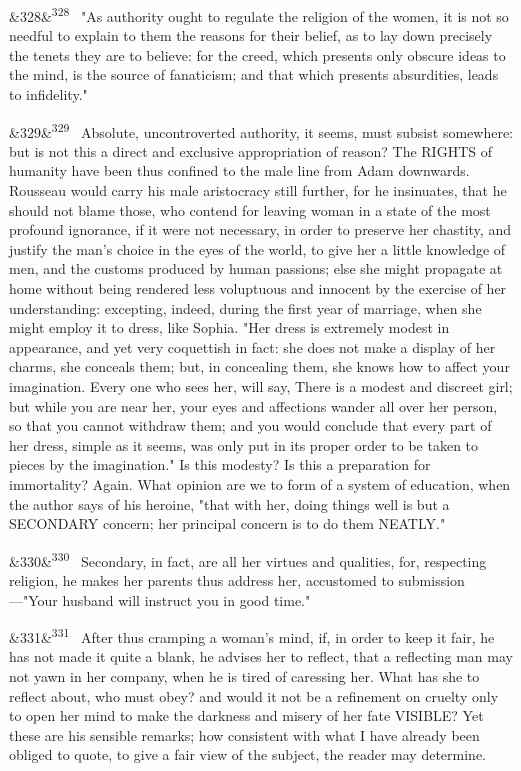 \documentclass[12pt]{article}
\newcommand{\para}[1][]{\par\noindent\ifx&#1&\else\textsuperscript{\footnotesize #1}~\fi}
\begin{document}
\para[328] "As authority ought to regulate the religion of the women, it is not so needful to explain to them the reasons for their belief, as to lay down precisely the tenets they are to believe: for the creed, which presents only obscure ideas to the mind, is the source of fanaticism; and that which presents absurdities, leads to infidelity."

\para[329] Absolute, uncontroverted authority, it seems, must subsist somewhere: but is not this a direct and exclusive appropriation of reason? The RIGHTS of humanity have been thus confined to the male line from Adam downwards. Rousseau would carry his male aristocracy still further, for he insinuates, that he should not blame those, who contend for leaving woman in a state of the most profound ignorance, if it were not necessary, in order to preserve her chastity, and justify the man's choice in the eyes of the world, to give her a little knowledge of men, and the customs produced by human passions; else she might propagate at home without being rendered less voluptuous and innocent by the exercise of her understanding: excepting, indeed, during the first year of marriage, when she might employ it to dress, like Sophia. "Her dress is extremely modest in appearance, and yet very coquettish in fact: she does not make a display of her charms, she conceals them; but, in concealing them, she knows how to affect your imagination. Every one who sees her, will say, There is a modest and discreet girl; but while you are near her, your eyes and affections wander all over her person, so that you cannot withdraw them; and you would conclude that every part of her dress, simple as it seems, was only put in its proper order to be taken to pieces by the imagination." Is this modesty? Is this a preparation for immortality? Again. What opinion are we to form of a system of education, when the author says of his heroine, "that with her, doing things well is but a SECONDARY concern; her principal concern is to do them NEATLY."

\para[330] Secondary, in fact, are all her virtues and qualities, for, respecting religion, he makes her parents thus address her, accustomed to submission---"Your husband will instruct you in good time."

\para[331] After thus cramping a woman's mind, if, in order to keep it fair, he has not made it quite a blank, he advises her to reflect, that a reflecting man may not yawn in her company, when he is tired of caressing her. What has she to reflect about, who must obey? and would it not be a refinement on cruelty only to open her mind to make the darkness and misery of her fate VISIBLE? Yet these are his sensible remarks; how consistent with what I have already been obliged to quote, to give a fair view of the subject, the reader may determine.
\end{document}
